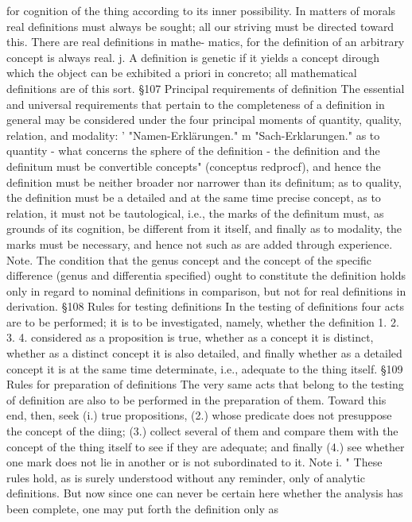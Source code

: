 {for cognition of the thing according to its inner possibility.
In matters of morals real definitions must always be sought; all our
striving must be directed toward this. There are real definitions in mathe-
matics, for the definition of an arbitrary concept is always real.
j. A definition is genetic if it yields a concept dirough which the object can be
exhibited a priori in concreto; all mathematical definitions are of this sort.
§107
Principal requirements of definition
The essential and universal requirements that pertain to the completeness
of a definition in general may be considered under the four principal
moments of quantity, quality, relation, and modality:
' "Namen-Erklärungen."
m "Sach-Erklarungen."
as to quantity - what concerns the sphere of the definition - the definition
and the definitum must be convertible concepts" (conceptus redprocf), and hence
the definition must be neither broader nor narrower than its definitum;
as to quality, the definition must be a detailed and at the same time precise
concept,
as to relation, it must not be tautological, i.e., the marks of the definitum must,
as grounds of its cognition, be different from it itself, and finally
as to modality, the marks must be necessary, and hence not such as are added
through experience.
Note.
The condition that the genus concept and the concept of the specific
difference (genus and differentia specified) ought to constitute the definition
holds only in regard to nominal definitions in comparison, but not for real
definitions in derivation.
§108
Rules for testing definitions
In the testing of definitions four acts are to be performed; it is to be
investigated, namely, whether the definition
1.
2.
3.
4.
considered as a proposition is true, whether
as a concept it is distinct,
whether as a distinct concept it is also detailed, and finally whether
as a detailed concept it is at the same time determinate, i.e., adequate to the
thing itself.
§109
Rules for preparation of definitions
The very same acts that belong to the testing of definition are also to be
performed in the preparation of them. Toward this end, then, seek (i.)
true propositions, (2.) whose predicate does not presuppose the concept
of the diing; (3.) collect several of them and compare them with the
concept of the thing itself to see if they are adequate; and finally (4.) see
whether one mark does not lie in another or is not subordinated to it.
Note i.
"
These rules hold, as is surely understood without any reminder, only of
analytic definitions. But now since one can never be certain here whether
the analysis has been complete, one may put forth the definition only as
}

